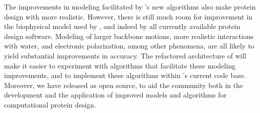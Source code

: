 The improvements in modeling facilitated by 's new algorithms also make protein design with \osprey more realistic.  However, there is still much room for improvement in the biophysical model used by \osprey, and indeed by all currently available protein design software.  Modeling of larger backbone motions, more realistic interactions with water, and electronic polarization, among other phenomena, are all likely to yield substantial improvements in accuracy.  The refactored architecture of  will make it easier to experiment with algorithms that facilitate these modeling improvements, and to implement these algorithms within \osprey's current code base.  Moreover, we have released  as open source, to aid the community both in the development and the application of improved models and algorithms for computational protein design.  


